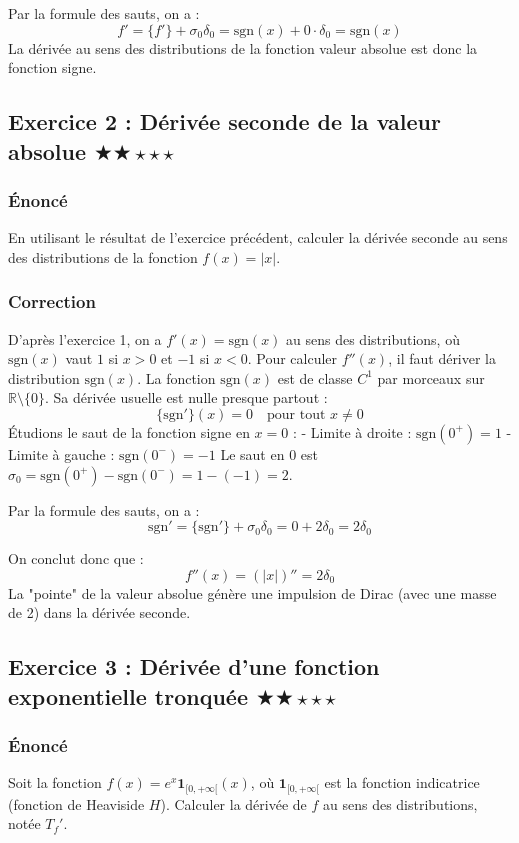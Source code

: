 \documentclass[11pt,a4paper]{article}
\begin{document}
Par la formule des sauts, on a :
$$ f' = \{f'\} + \sigma_0 \delta_0 = \text{sgn}(x) + 0 \cdot \delta_0 = \text{sgn}(x) $$
La dérivée au sens des distributions de la fonction valeur absolue est donc la fonction signe.


\subsection*{Exercice 2 : Dérivée seconde de la valeur absolue  \quad$\bigstar\bigstar\star\star\star$}


\subsubsection*{Énoncé}
En utilisant le résultat de l'exercice précédent, calculer la dérivée seconde au sens des distributions de la fonction $f(x) = |x|$.

\subsubsection*{Correction}
D'après l'exercice 1, on a $f'(x) = \text{sgn}(x)$ au sens des distributions, où $\text{sgn}(x)$ vaut $1$ si $x > 0$ et $-1$ si $x < 0$.
Pour calculer $f''(x)$, il faut dériver la distribution $\text{sgn}(x)$.
La fonction $\text{sgn}(x)$ est de classe $C^1$ par morceaux sur $\mathbb{R} \setminus \{0\}$.
Sa dérivée usuelle est nulle presque partout :
$$ \{\text{sgn}'\}(x) = 0 \quad \text{pour tout } x \neq 0 $$
Étudions le saut de la fonction signe en $x = 0$ :
- Limite à droite : $\text{sgn}(0^+) = 1$
- Limite à gauche : $\text{sgn}(0^-) = -1$
Le saut en $0$ est $\sigma_0 = \text{sgn}(0^+) - \text{sgn}(0^-) = 1 - (-1) = 2$.

Par la formule des sauts, on a :
$$ \text{sgn}' = \{\text{sgn}'\} + \sigma_0 \delta_0 = 0 + 2\delta_0 = 2\delta_0 $$

On conclut donc que :
$$ f''(x) = (|x|)'' = 2\delta_0 $$
La "pointe" de la valeur absolue génère une impulsion de Dirac (avec une masse de 2) dans la dérivée seconde.


\subsection*{Exercice 3 : Dérivée d'une fonction exponentielle tronquée  \quad$\bigstar\bigstar\star\star\star$}


\subsubsection*{Énoncé}
Soit la fonction $f(x) = e^x \mathbf{1}_{[0, +\infty[}(x)$, où $\mathbf{1}_{[0, +\infty[}$ est la fonction indicatrice (fonction de Heaviside $H$).
Calculer la dérivée de $f$ au sens des distributions, notée $T_f'$.
\end{document}
